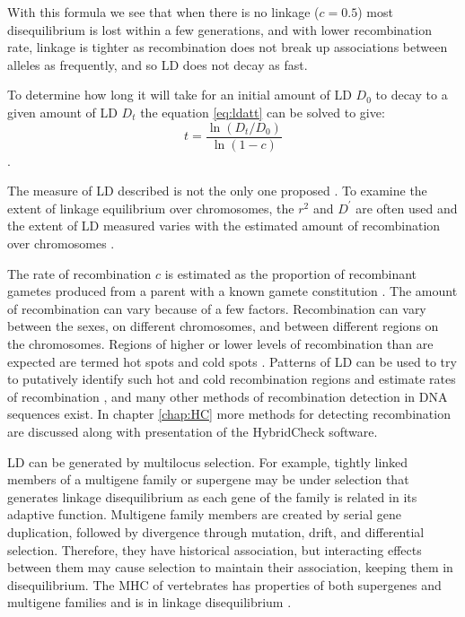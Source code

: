 With this formula we see that when there is no linkage ($c=0.5$) most disequilibrium is lost within a few generations, and with lower recombination rate, linkage is tighter as recombination does not break up associations between alleles as frequently, and so LD does not decay as fast.

To determine how long it will take for an initial amount of LD $D_0$ to decay to a given amount of LD $D_t$ the equation \ref{eq:ldatt} can be solved to give:
\begin{equation}
t=\frac{\ln(D_t/D_0)}{\ln(1-c)}
\end{equation}
\parencite{Hedrick2010}.

The measure of LD described is not the only one proposed \parencite{Hedrick1987,Lewontin1988,Devlin1995}.
To examine the extent of linkage equilibrium over chromosomes, the $r^2$ and $D^\prime$ are often used and the extent of LD measured varies with the estimated amount of recombination over chromosomes \parencite{Dawson2002}.

The rate of recombination $c$ is estimated as the proportion of recombinant gametes produced from a parent with a known gamete constitution \parencite{Hedrick2010}.
The amount of recombination can vary because of a few factors. 
Recombination can vary between the sexes, on different chromosomes, and between different regions on the chromosomes.
Regions of higher or lower levels of recombination than are expected are termed hot spots and cold spots \parencite{Arnheim2003,Kauppi2004}.
Patterns of LD can be used to try to putatively identify such hot and cold recombination regions and estimate rates of recombination \parencite{Stumpf2003,Ptak2004,Auton2007}, and many other methods of recombination detection in DNA sequences exist.
In chapter \ref{chap:HC} more methods for detecting recombination are discussed along with presentation of the HybridCheck software.

LD can be generated by multilocus selection.
For example, tightly linked members of a multigene family or supergene \parencite{bhl29158} may be under selection that generates linkage disequilibrium as each gene of the family is related in its adaptive function.
Multigene family members are created by serial gene duplication, followed by divergence through mutation, drift, and differential selection.
Therefore, they have historical association, but interacting effects between them may cause selection to maintain their association, keeping them in disequilibrium.
The MHC of vertebrates has properties of both supergenes and multigene families and is in linkage disequilibrium \parencite{Edwards1998,Beck2000}.

